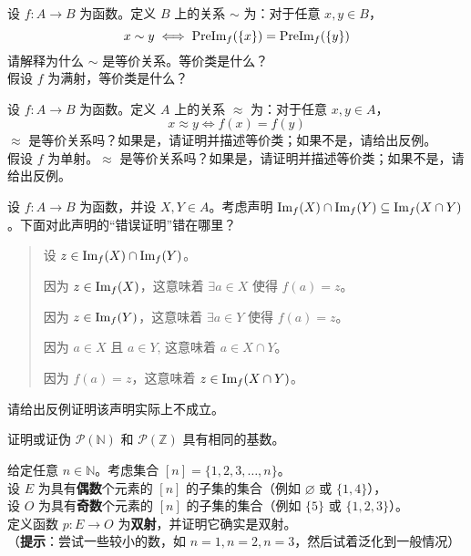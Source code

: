 \begin{exercise}
    设 $f : A \to B$ 为函数。定义 $B$ 上的关系 $\sim$ 为：对于任意 $x,y \in B$，
    \[x \sim y \iff \text{PreIm}_f (\{x\}) = \text{PreIm}_f (\{y\})\]
    请解释为什么 $\sim$ 是等价关系。等价类是什么？\\
    假设 $f$ 为满射，等价类是什么？
\end{exercise}

\begin{exercise}
    设 $f : A \to B$ 为函数。定义 $A$ 上的关系 $\approx$ 为：对于任意 $x,y \in A$，
    \[x \approx y \iff f(x) = f(y)\]
    $\approx$ 是等价关系吗？如果是，请证明并描述等价类；如果不是，请给出反例。\\
    假设 $f$ 为单射。$\approx$ 是等价关系吗？如果是，请证明并描述等价类；如果不是，请给出反例。
\end{exercise}

\begin{exercise}
    设 $f : A \to B$ 为函数，并设 $X,Y \in A$。考虑声明 $\text{Im}_f (X) \cap \text{Im}_f (Y) \subseteq \text{Im}_f (X \cap Y )$。下面对此声明的``错误证明''错在哪里？
    \begin{quote}
        \begin{spoof}
            设 $z \in \text{Im}_f (X) \cap \text{Im}_f (Y)$。

            因为 $z \in \text{Im}_f (X)$，这意味着 $\exists a \in X$ 使得 $f(a) = z$。

            因为 $z \in \text{Im}_f (Y)$，这意味着 $\exists a \in Y$ 使得 $f(a) = z$。

            因为 $a \in X$ 且 $a \in Y$, 这意味着 $a \in X \cap Y$。

            因为 $f(a) = z$，这意味着 $z \in \text{Im}_f (X \cap Y)$。
        \end{spoof}
    \end{quote}
    请给出反例证明该声明实际上不成立。
\end{exercise}

\begin{exercise}
    证明或证伪 $\mathcal{P}(\mathbb{N})$ 和 $\mathcal{P}(\mathbb{Z})$ 具有相同的基数。
\end{exercise}

\begin{exercise}
    给定任意 $n \in \mathbb{N}$。考虑集合 $[n] = \{1, 2, 3, \dots , n\}$。\\
    设 $E$ 为具有\textbf{偶数}个元素的 $[n]$ 的子集的集合（例如 $\varnothing$ 或 $\{1,4\}$），\\
    设 $O$ 为具有\textbf{奇数}个元素的 $[n]$ 的子集的集合（例如 $\{5\}$ 或 $\{1,2,3\}$）。\\
    定义函数 $p : E \to O$ 为\textbf{双射}，并证明它确实是双射。\\
    （\textbf{提示}：尝试一些较小的数，如 $n = 1, n = 2, n = 3$，然后试着泛化到一般情况）
\end{exercise}

